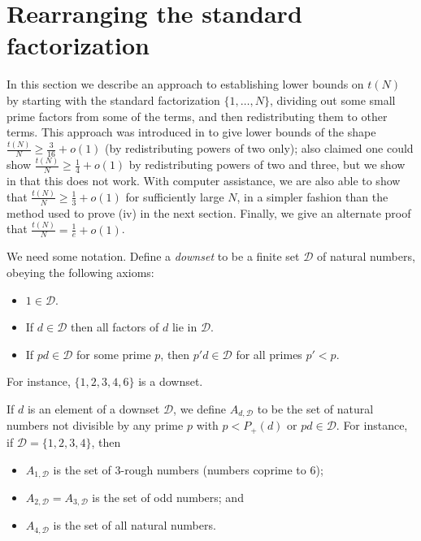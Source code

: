 \documentclass[12pt,a4paper,reqno]{amsart}
\numberwithin{equation}{section}
\theoremstyle{plain}
\theoremstyle{definition}
\begin{document}
\section{Rearranging the standard factorization}\label{rearrange-sec}

In this section we describe an approach to establishing lower bounds on $t(N)$ by starting with the standard factorization $\{1,\dots,N\}$, dividing out some small prime factors from some of the terms, and then redistributing them to other terms.  This approach was introduced in \cite{guy-selfridge} to give lower bounds of the shape $\frac{t(N)}{N} \geq \frac{3}{16} + o(1)$ (by redistributing powers of two only); \cite{guy-selfridge} also claimed one could show $\frac{t(N)}{N} \geq \frac{1}{4} + o(1)$ by redistributing powers of two and three, but we show in  that this does not work.  With computer assistance, we are also able to show that $\frac{t(N)}{N} \geq \frac{1}{3}+o(1)$ for sufficiently large $N$, in a simpler fashion than the method used to prove (iv) in the next section.  Finally, we give an alternate proof that $\frac{t(N)}{N} = \frac{1}{e}+o(1)$.

We need some notation.  Define a \emph{downset} to be a finite set ${\mathcal D}$ of natural numbers, obeying the following axioms:
\begin{itemize}
  \item $1 \in {\mathcal D}$.
  \item If $d \in {\mathcal D}$ then all factors of $d$ lie in ${\mathcal D}$.
  \item If $pd \in {\mathcal D}$ for some prime $p$, then $p'd \in {\mathcal D}$ for all primes $p'<p$.
\end{itemize}
For instance, $\{1,2,3,4,6\}$ is a downset.  

If $d$ is an element of a downset ${\mathcal D}$, we define $A_{d,\mathcal{D}}$ to be the set of natural numbers not divisible by any prime $p$ with $p < P_+(d)$ or $pd \in \mathcal{D}$.  For instance, if ${\mathcal D} = \{1,2,3,4\}$, then
\begin{itemize}
\item $A_{1,{\mathcal D}}$ is the set of $3$-rough numbers (numbers coprime to $6$);
\item $A_{2,{\mathcal D}} = A_{3,{\mathcal D}}$ is the set of odd numbers; and
\item $A_{4,{\mathcal D}}$ is the set of all natural numbers.
\end{itemize}
\end{document}
